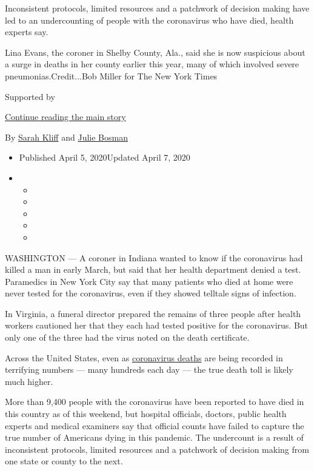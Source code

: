 Inconsistent protocols, limited resources and a patchwork of decision
making have led to an undercounting of people with the coronavirus who
have died, health experts say.

Lina Evans, the coroner in Shelby County, Ala., said she is now
suspicious about a surge in deaths in her county earlier this year, many
of which involved severe pneumonias.Credit...Bob Miller for The New York
Times

Supported by

\protect\hyperlink{after-sponsor}{Continue reading the main story}

By \href{https://www.nytimes.com/by/sarah-kliff}{Sarah Kliff} and
\href{https://www.nytimes.com/by/julie-bosman}{Julie Bosman}

\begin{itemize}
\item
  Published April 5, 2020Updated April 7, 2020
\item
  \begin{itemize}
  \item
  \item
  \item
  \item
  \item
  \end{itemize}
\end{itemize}

WASHINGTON --- A coroner in Indiana wanted to know if the coronavirus
had killed a man in early March, but said that her health department
denied a test. Paramedics in New York City say that many patients who
died at home were never tested for the coronavirus, even if they showed
telltale signs of infection.

In Virginia, a funeral director prepared the remains of three people
after health workers cautioned her that they each had tested positive
for the coronavirus. But only one of the three had the virus noted on
the death certificate.

Across the United States, even as
\href{https://www.nytimes.com/interactive/2020/04/21/world/coronavirus-missing-deaths.html}{coronavirus
deaths} are being recorded in terrifying numbers --- many hundreds each
day --- the true death toll is likely much higher.

More than 9,400 people with the coronavirus have been reported to have
died in this country as of this weekend, but hospital officials,
doctors, public health experts and medical examiners say that official
counts have failed to capture the true number of Americans dying in this
pandemic. The undercount is a result of inconsistent protocols, limited
resources and a patchwork of decision making from one state or county to
the next.

